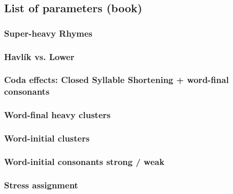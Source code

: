 \subsection{List of parameters  (book)}

\subsubsection{Super-heavy Rhymes}
\subsubsection{Havlík vs. Lower}
\subsubsection{Coda effects: Closed Syllable Shortening + word-final consonants}
\subsubsection{Word-final  heavy clusters}
\subsubsection{Word-initial  clusters}
\subsubsection{Word-initial consonants strong / weak}
\subsubsection{Stress assignment}